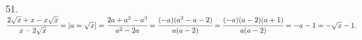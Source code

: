 51. $\cfrac{2\sqrt{x}+x-x\sqrt{x}}{x-2\sqrt{x}}=[a=\sqrt{x}]=
\cfrac{2a+a^2-a^3}{a^2-2a}=\cfrac{(-a)(a^2-a-2)}{a(a-2)}=\cfrac{(-a)(a-2)(a+1)}{a(a-2)}=-a-1=-\sqrt{x}-1.$\\
